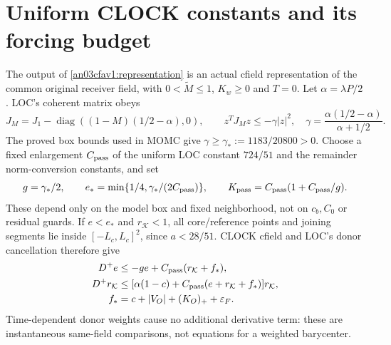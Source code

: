 \documentclass[11pt]{article}
\theoremstyle{remark}\newtheorem{remark}[theorem]{Remark}
\newcommand{\KK}{\mathcal K}
\newcommand{\eps}{\varepsilon}
\begin{document}
\section{Uniform CLOCK constants and its forcing budget}
The output of \eqref{an03cfav1:representation} is an actual
cfield representation of the common original receiver field,
with $0<\widetilde M\le1$, $K_w\ge0$ and $T=0$.
Let $\alpha=\lambda P/2$.
LOC's coherent matrix obeys
\[
 J_M=J_1-\operatorname{diag}((1-M)(1/2-\alpha),0),\qquad
 z^TJ_Mz\le-\gamma|z|^2,\quad
 \gamma=\frac{\alpha(1/2-\alpha)}{\alpha+1/2}.
\]
The proved box bounds used in MOMC give
$\gamma\ge\gamma_*:=1183/20800>0$.
Choose a fixed enlargement $C_{\rm pass}$ of the uniform
LOC constant $724/51$ and the remainder norm-conversion
constants, and set
\begin{equation}
 g=\gamma_*/2,\qquad
 e_*=\min\{1/4,\gamma_*/(2C_{\rm pass})\},\qquad
 K_{\rm pass}=C_{\rm pass}(1+C_{\rm pass}/g).
 \label{an03cfav1:passconstants}
\end{equation}
These depend only on the model box and fixed neighborhood,
not on $c_b,C_0$ or residual guards. If $e<e_*$ and
$r_{\KK}<1$, all core/reference points and joining segments
lie inside $[-L_c,L_c]^2$, since $a<28/51$.
CLOCK cfield and LOC's donor cancellation therefore give
\begin{equation}
 \begin{split}
 D^+e&\le-ge+C_{\rm pass}(r_{\KK}+f_*),\\
 D^+r_{\KK}&\le
 [\alpha(1-c)+C_{\rm pass}(e+r_{\KK}+f_*)]r_{\KK},\\
 f_*&=c+|V_O|+(K_O)_++\eps_F .
 \end{split}
 \label{an03cfav1:localineq}
\end{equation}
Time-dependent donor weights cause no additional derivative
term: these are instantaneous same-field comparisons, not
equations for a weighted barycenter.
\end{document}
